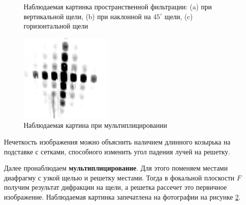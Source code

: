 \documentclass[12pt]{kiarticle} %
\begin{document}
\begin{figure}[h]
\begin{minipage}[h]{0.3\linewidth}
		\end{minipage}
		\caption{Наблюдаемая картинка пространственной фильтрации: (a) при вертикальной щели, (b) при наклонной на $45^\circ$ щели, (c) горизонтальной щели }
		\label{rotate}
	\end{figure}

	\begin{figure}[h!]
	\centering	
	\includegraphics[width=0.4\textwidth]{mult.png}
	\caption{Наблюдаемая картина при мультиплицировании}
	\label{mult}
\end{figure}
	
	Нечеткость изображения можно объяснить наличием длинного козырька на подставке с сетками, способного изменить угол падения лучей на решетку.
	
	Далее пронаблюдаем \textbf{мультиплицирование}. Для этого поменяем местами диафрагму с узкой щелью и решетку местами. Тогда в фокальной плоскости $F$ получим результат дифракции на щели, а решетка рассечет это первичное изображение. Наблюдаемая картинка запечатлена на фотографии на рисунке \ref{mult}. 
\end{document}
